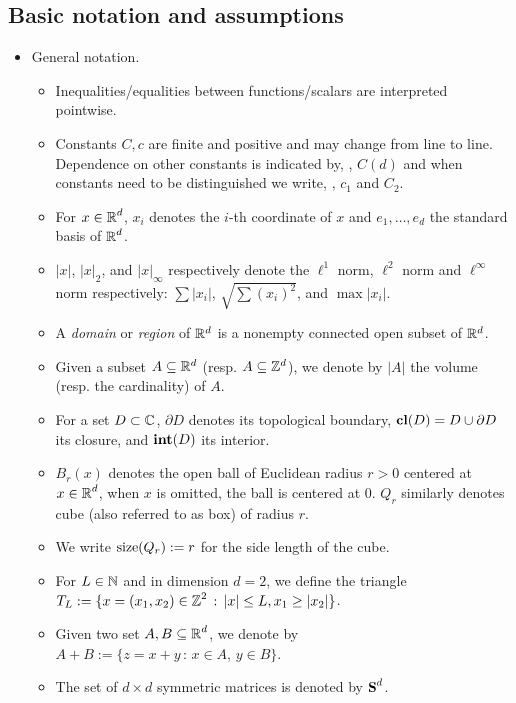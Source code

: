 \documentclass[12pt]{amsart}
\numberwithin{equation}{section}
\begin{document}
	\subsection{Basic notation and assumptions} \label{subsec:notation}
	\begin{itemize}
		\item General notation.
		\begin{itemize} 
			\item Inequalities/equalities between functions/scalars are interpreted pointwise.
			\item Constants $C, c$ are finite and positive and may change from line to line. Dependence on other constants is indicated by, \eg, $C(d)$
			and when constants need to be distinguished we write, \eg, $c_1$ and $C_2$. 
			\item For $x \in \operatorname{\mathbb{R}}^d$, $x_i$ denotes the $i$-th coordinate of $x$ and $e_1, \ldots, e_d$ the standard basis of $\operatorname{\mathbb{R}}^d$.
			\item $|x|$, $|x|_2$, and $|x|_{\infty}$ respectively denote the $\ell^1$ norm, $\ell^2$ norm and $\ell^{\infty}$ norm respectively: $\sum |x_i|$, $\sqrt{\sum (x_i)^2}$, and $\max |x_i|$.
			\item A \emph{domain} or \emph{region} of $\mathbb{R}^d$ is a nonempty connected open subset of $\mathbb{R}^d$.
			\item Given a subset $A \subseteq \mathbb{R}^d$ (resp. $A \subseteq \mathbb{Z}^d$), we denote by $\left| A \right|$ the volume (resp. the cardinality) of $A$.
			\item For a set $D \subset \operatorname{\mathbb{C}}$, $\partial D$ denotes its topological boundary, $\mathbf{cl}(D) = D \cup \partial D$ its closure, 
			and $\operatorname{\mathbf{int}}(D)$ its interior. 
			\item $B_r(x)$ denotes the open ball of Euclidean radius $r > 0$ centered at $x \in \operatorname{\mathbb{R}}^d$, when $x$ is omitted, the ball is centered at 0. $Q_r$ similarly 
			denotes cube (also referred to as box) of radius $r$. 
			\item We write $\mathrm{size}(Q_r) := r$ for the side length of the cube.
			\item For $L \in \operatorname{\mathbb{N}}$ and in dimension $d = 2$, we define the triangle $T_L := \{ x = (x_1 , x_2) \in \operatorname{\mathbb{Z}}^2 \, : \, |x| \leq L, x_1 \geq |x_2|\}$.
			\item Given two set $A,B \subseteq \operatorname{\mathbb{R}}^d$, we denote by $A + B := \{ z = x + y \, : \, x \in A , \, y \in B \}.$
			\item The set of $d \times d$ symmetric matrices is denoted by $\operatorname{{\mbox{\bf S}}}^d$.
		\end{itemize}
		

\end{itemize}
\end{document}
